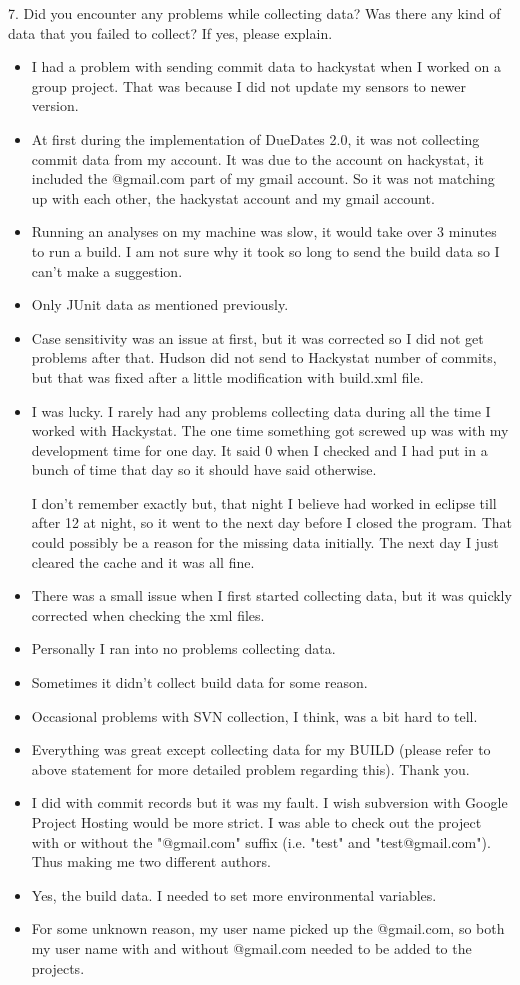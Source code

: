7. Did you encounter any problems while collecting data? Was 
there any kind of data that you failed to collect? If yes, 
please explain. 
\begin{itemize}
\item I had a problem with sending commit data to hackystat when I worked on a group project. That was because I did not update my sensors to newer version. 
\item At first during the implementation of DueDates 2.0, it was not collecting commit data from my account. It was due to the account on hackystat, it included the @gmail.com part of my gmail account. So it was not matching up with each other, the hackystat account and my gmail account.
\item Running an analyses on my machine was slow, it would take over 3 minutes to run a build.  I am not sure why it took so long to send the build data so I can't make a suggestion.
\item Only JUnit data as mentioned previously.
\item Case sensitivity was an issue at first, but it was corrected so I did not get problems after that.  Hudson did not send to Hackystat number of commits, but that was fixed after a little modification with build.xml file.   
\item I was lucky. I rarely had any problems collecting data during all the time I worked with Hackystat. The one time something got screwed up was with my development time for one day. It said 0 when I checked and I had put in a bunch of time that day so it should have said otherwise. 

I don't remember exactly but, that night I believe had worked in eclipse till after 12 at night, so it went to the next day before I closed the program. That could possibly be a reason for the missing data initially. The next day I just cleared the cache and it was all fine.
\item There was a small issue when I first started collecting data, but it was quickly corrected when checking the xml files.
\item Personally I ran into no problems collecting data.
\item Sometimes it didn't collect build data for some reason.
\item Occasional problems with SVN collection, I think, was a bit hard to tell.
\item Everything was great except collecting data for my BUILD (please refer to above statement for more detailed problem regarding this). Thank you.
\item I did with commit records but it was my fault.  I wish subversion with Google Project Hosting would be more strict.  I was able to check out the project with or without the "@gmail.com" suffix (i.e. "test" and "test@gmail.com").  Thus making me two different authors.
\item Yes, the build data.  I needed to set more environmental variables. 
\item For some unknown reason, my user name picked up the @gmail.com, so both my user name with and without @gmail.com needed to be added to the projects.
\end{itemize}

